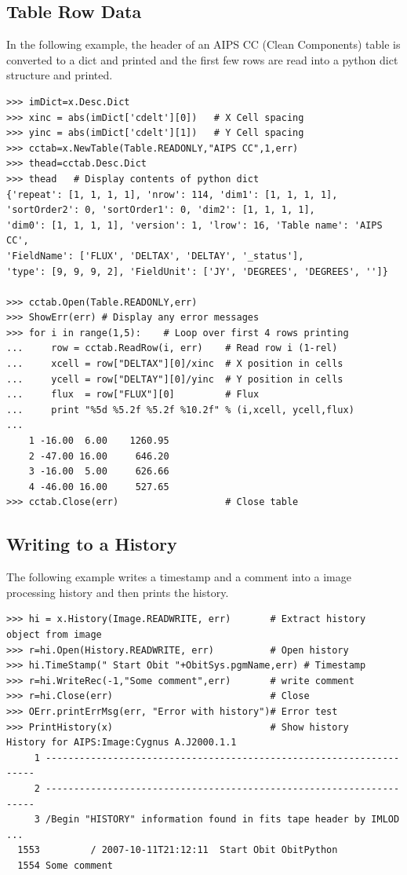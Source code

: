 \documentclass[11pt]{report}
\begin{document}
\subsection{Table Row Data}
In the following example, the header of an AIPS CC (Clean Components) 
table is converted to a dict and printed and the first few rows 
are read into a python dict structure and printed.
\begin{verbatim}
>>> imDict=x.Desc.Dict
>>> xinc = abs(imDict['cdelt'][0])   # X Cell spacing
>>> yinc = abs(imDict['cdelt'][1])   # Y Cell spacing
>>> cctab=x.NewTable(Table.READONLY,"AIPS CC",1,err)
>>> thead=cctab.Desc.Dict
>>> thead   # Display contents of python dict
{'repeat': [1, 1, 1, 1], 'nrow': 114, 'dim1': [1, 1, 1, 1],
'sortOrder2': 0, 'sortOrder1': 0, 'dim2': [1, 1, 1, 1], 
'dim0': [1, 1, 1, 1], 'version': 1, 'lrow': 16, 'Table name': 'AIPS CC', 
'FieldName': ['FLUX', 'DELTAX', 'DELTAY', '_status'], 
'type': [9, 9, 9, 2], 'FieldUnit': ['JY', 'DEGREES', 'DEGREES', '']}

>>> cctab.Open(Table.READONLY,err)
>>> ShowErr(err) # Display any error messages
>>> for i in range(1,5):    # Loop over first 4 rows printing
...     row = cctab.ReadRow(i, err)    # Read row i (1-rel)
...     xcell = row["DELTAX"][0]/xinc  # X position in cells
...     ycell = row["DELTAY"][0]/yinc  # Y position in cells
...     flux  = row["FLUX"][0]         # Flux
...     print "%5d %5.2f %5.2f %10.2f" % (i,xcell, ycell,flux)
... 
    1 -16.00  6.00    1260.95
    2 -47.00 16.00     646.20
    3 -16.00  5.00     626.66
    4 -46.00 16.00     527.65
>>> cctab.Close(err)                   # Close table

\end{verbatim}

\subsection{Writing to a History}
The following example writes a timestamp and a comment into a image
processing history and then prints the history.
\begin{verbatim}
>>> hi = x.History(Image.READWRITE, err)       # Extract history object from image
>>> r=hi.Open(History.READWRITE, err)          # Open history
>>> hi.TimeStamp(" Start Obit "+ObitSys.pgmName,err) # Timestamp
>>> r=hi.WriteRec(-1,"Some comment",err)       # write comment
>>> r=hi.Close(err)                            # Close
>>> OErr.printErrMsg(err, "Error with history")# Error test
>>> PrintHistory(x)                            # Show history
History for AIPS:Image:Cygnus A.J2000.1.1
     1 --------------------------------------------------------------------  
     2 --------------------------------------------------------------------  
     3 /Begin "HISTORY" information found in fits tape header by IMLOD       
...
  1553         / 2007-10-11T21:12:11  Start Obit ObitPython
  1554 Some comment
\end{verbatim}
\end{document}
